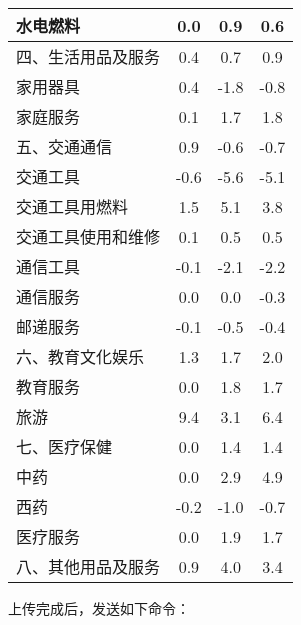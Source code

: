 \begin{table}[h]
\begin{tabular}{lccc}
        水电燃料 & 0.0 & 0.9 & 0.6 \\
        \midrule
        四、生活用品及服务 & 0.4 & 0.7 & 0.9 \\
        家用器具 & 0.4 & -1.8 & -0.8 \\
        家庭服务 & 0.1 & 1.7 & 1.8 \\
        \midrule
        五、交通通信 & 0.9 & -0.6 & -0.7 \\
        交通工具 & -0.6 & -5.6 & -5.1 \\
        交通工具用燃料 & 1.5 & 5.1 & 3.8 \\
        交通工具使用和维修 & 0.1 & 0.5 & 0.5 \\
        通信工具 & -0.1 & -2.1 & -2.2 \\
        通信服务 & 0.0 & 0.0 & -0.3 \\
        邮递服务 & -0.1 & -0.5 & -0.4 \\
        \midrule
        六、教育文化娱乐 & 1.3 & 1.7 & 2.0 \\
        教育服务 & 0.0 & 1.8 & 1.7 \\
        旅游 & 9.4 & 3.1 & 6.4 \\
        \midrule
        七、医疗保健 & 0.0 & 1.4 & 1.4 \\
        中药 & 0.0 & 2.9 & 4.9 \\
        西药 & -0.2 & -1.0 & -0.7 \\
        医疗服务 & 0.0 & 1.9 & 1.7 \\
        \midrule
        八、其他用品及服务 & 0.9 & 4.0 & 3.4 \\
        \bottomrule
    \end{tabular}
\end{table}
\FloatBarrier

上传完成后，发送如下命令：


